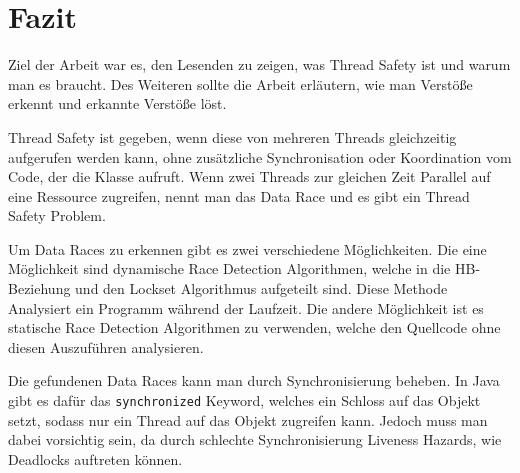 \section{Fazit}

Ziel der Arbeit war es, den Lesenden zu zeigen, was Thread Safety ist und warum man es braucht. Des Weiteren sollte die Arbeit erläutern, wie man Verstöße erkennt und erkannte Verstöße löst.
%
%
%
%

Thread Safety ist gegeben, wenn diese von mehreren Threads gleichzeitig aufgerufen werden kann, ohne zusätzliche Synchronisation oder Koordination vom Code, der die Klasse aufruft. Wenn zwei Threads zur gleichen Zeit Parallel auf eine Ressource zugreifen, nennt man das Data Race und es gibt ein Thread Safety Problem.

Um Data Races zu erkennen gibt es zwei verschiedene Möglichkeiten. Die eine Möglichkeit sind dynamische Race Detection Algorithmen, welche in die \acs{HB}-Beziehung und den Lockset Algorithmus aufgeteilt sind. Diese Methode Analysiert ein Programm während der Laufzeit. Die andere Möglichkeit ist es statische Race Detection Algorithmen zu verwenden, welche den Quellcode ohne diesen Auszuführen analysieren.

Die gefundenen Data Races kann man durch Synchronisierung beheben. In Java gibt es dafür das \texttt{synchronized} Keyword, welches ein Schloss auf das Objekt setzt, sodass nur ein Thread auf das Objekt zugreifen kann. Jedoch muss man dabei vorsichtig sein, da durch schlechte Synchronisierung Liveness Hazards, wie Deadlocks auftreten können.